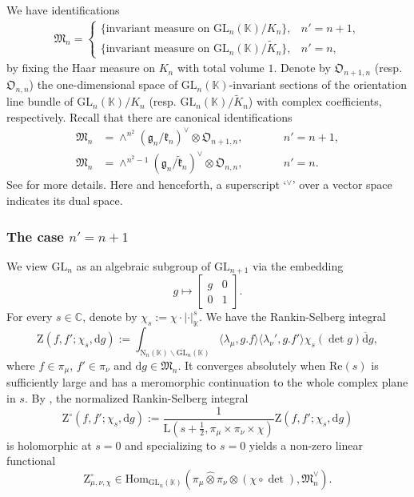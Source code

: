 \documentclass[12pt, a4paper]{amsart}
\newcommand{\RL}{{\mathrm {L}}}
\newcommand{\RN}{{\mathrm {N}}}
\newcommand{\RZ}{{\mathrm {Z}}}
\newcommand{\GL}{{\mathrm{GL}}}
\newcommand{\C}{\mathbb{C}}
\newcommand{\K}{\mathbb{K}}
\theoremstyle{Theorem}
\theoremstyle{Theorem}
\theoremstyle{Theorem}
\theoremstyle{Theorem}
\theoremstyle{Plain}
\theoremstyle{Definition}
\begin{document}
	We have identifications
	\begin{equation}
		\label{measure}
		\begin{aligned}
			\mathfrak{M}_{n}=\begin{cases}
				\{\text{invariant measure on }\GL_{n}(\K)/K_{n}\}, & n'=n+1,\\
				\{\text{invariant measure on }\GL_{n}(\K)/\widetilde{K}_{n}\}, & n'=n,
			\end{cases}
		\end{aligned}
	\end{equation}
	by fixing the Haar measure on $K_{n}$ with total volume $1$. Denote by $\mathfrak{O}_{n+1,n}$ (resp. $\mathfrak{O}_{n,n}$) the one-dimensional space of $\GL_{n}(\K)$-invariant sections of the orientation line bundle of $\GL_{n}(\K)/K_{n}$ (resp. $\GL_{n}(\K)/\widetilde{K}_{n}$) with complex coefficients, respectively. Recall that there are canonical identifications
	\begin{equation}
		\label{orientationid}
		\begin{aligned}
			\mathfrak{M}_n&=\wedge^{n^2}(\mathfrak{g}_n/\mathfrak{k}_n)^{\vee}\otimes\mathfrak{O}_{n+1,n}, &\qquad &n'=n+1,\\
			\mathfrak{M}_n&=\wedge^{n^2-1}(\mathfrak{g}_n/\widetilde{\mathfrak{k}}_n)^{\vee}\otimes\mathfrak{O}_{n,n}, &\qquad & n'=n.
		\end{aligned}
	\end{equation}
	See \cite[Section 3.1]{LLS24} for more details. Here and henceforth, a superscript `$^\vee$' over a vector space indicates its dual space.
	
	\subsubsection{The case $n'=n+1$}
	
	
	
	We view $\GL_{n}$ as an algebraic subgroup of $\GL_{n+1}$ via the embedding
	\[
	g\mapsto\begin{bmatrix}
		g & 0\\
		0 & 1
	\end{bmatrix}.
	\]
	For every $s\in\C$, denote by $\chi_s:=\chi\cdot|\cdot|^s_{\K}$. We have the Rankin-Selberg integral
	\[
	\RZ(f,f';\chi_s,\mathrm{d}g):=\int_{\RN_{n}(\K)\backslash\GL_{n}(\K)}\langle\lambda_{\mu},g.f\rangle\langle\lambda_{\nu}',g.f'\rangle\chi_s(\det g)\overline{\mathrm{d}}g,
	\]
	where $f\in\pi_{\mu}$, $f'\in\pi_{\nu}$ and $\mathrm{d}g\in\mathfrak{M}_{n}$. It converges absolutely when $\mathrm{Re}(s)$ is sufficiently large and has a meromorphic continuation to the whole complex plane in $s$. By \cite{J09}, the normalized Rankin-Selberg integral
	\[
	\RZ^{\circ}(f,f';\chi_s,\mathrm{d}g):=\frac{1}{\RL(s+\frac{1}{2},\pi_{\mu}\times\pi_{\nu}\times\chi)}\RZ(f,f';\chi_s,\mathrm{d}g)
	\]
	is holomorphic at $s=0$ and specializing to $s=0$ yields a non-zero linear functional
	\[
	\RZ_{\mu,\nu,\chi}^{\circ}\in\mathrm{Hom}_{\GL_{n}(\K)}\left(\pi_{\mu}\widehat{\otimes}\pi_{\nu}\otimes(\chi\circ\det),\mathfrak{M}_{n}^{\vee}\right).
	\]
	
\end{document}
